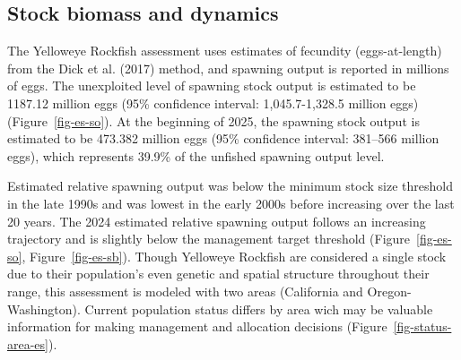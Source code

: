 \documentclass[
]{scrartcl}
\begin{document}
\subsection*{Stock biomass and
dynamics}\label{stock-biomass-and-dynamics}

The Yelloweye Rockfish assessment uses estimates of fecundity
(eggs-at-length) from the Dick et al. (2017) method, and spawning output
is reported in millions of eggs. The unexploited level of spawning stock
output is estimated to be 1187.12 million eggs (95\% confidence
interval: 1,045.7-1,328.5 million eggs) (Figure~\ref{fig-es-so}). At the
beginning of 2025, the spawning stock output is estimated to be 473.382
million eggs (95\% confidence interval: 381--566 million eggs), which
represents 39.9\% of the unfished spawning output level.

Estimated relative spawning output was below the minimum stock size
threshold in the late 1990s and was lowest in the early 2000s before
increasing over the last 20 years. The 2024 estimated relative spawning
output follows an increasing trajectory and is slightly below the
management target threshold (Figure~\ref{fig-es-so},
Figure~\ref{fig-es-sb}). Though Yelloweye Rockfish are considered a
single stock due to their population's even genetic and spatial
structure throughout their range, this assessment is modeled with two
areas (California and Oregon-Washington). Current population status
differs by area wich may be valuable information for making management
and allocation decisions (Figure~\ref{fig-status-area-es}).

\begingroup
\fontsize{9.0pt}{10.8pt}\selectfont
\end{document}
